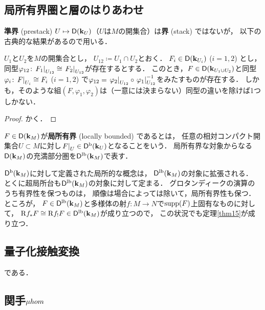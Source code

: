 \subsection{局所有界圏と層のはりあわせ}

\textbf{準界} (prestack) \(
    U\mapsto \Domp(\kk_U)
\)（\(U\)は\(M\)の開集合）は\textbf{界} (stack) ではないが，
以下の古典的な結果があるので用いる．
\begin{LMM}
    \(U_1\)と\(U_2\)を\(M\)の開集合とし，
    \(U_{12}\coloneqq U_1\cap U_2\)とおく．
    \(F_{i}\in\Domp(\kk_{U_i})\) (\(i=1,2\)) とし，
    同型\(
        \varphi_{12}\colon 
        \mres[F_{1}]{U_{12}}\cong \mres[F_{2}]{U_{12}}
    \)が存在するとする．
    このとき，\(F\in\Domp(\kk_{U_1\cup U_2})\)と同型\(
        \varphi_{i}\colon \mres[F]{U_{i}}\cong F_{i}
    \) (\(i=1,2\)) で\(
        \varphi_{12}=
        \mres[\varphi_{2}]{U_{12}}
        \circ
        \mres[\varphi_{1}]{U_{12}}^{-1}
    \)をみたすものが存在する．
    しかも，そのような組\(
        (F,\varphi_1,\varphi_2)
    \)は（一意には決まらない）同型の違いを除けば1つしかない．
\end{LMM}
\begin{proof}
    かく．
\end{proof}
\begin{DFN}
    \(F\in\Domp(\kk_M)\)が\textbf{局所有界} (locally bounded) であるとは，
    任意の相対コンパクト開集合\(U\subset M\)に対し\(\mres[F]{U}\in\Dompb(\kk_U)\)となることをいう．
    局所有界な対象からなる\(\Domp(\kk_M)\)の充満部分圏を\(\Domplb(\kk_M)\)で表す．
\end{DFN}

\(\Dompb(\kk_M)\)に対して定義された局所的な概念は，
\(\Domplb(\kk_M)\)の対象に拡張される．
とくに超局所台も\(\Domplb(\kk_M)\)の対象に対して定まる．
グロタンディークの演算のうち有界性を保つものは，
順像は場合によっては除いて，局所有界性も保つ．
ところが，
\(F\in\Domplb(\kk_M)\)と多様体の射\(
    f\colon M\to N
\)で\(\supp(F)\)上固有なものに対して，
\(
    \Rder{f_{\ast}}F\cong\Rder{f_{!}}F\in\Domplb(\kk_M)
\)が成り立つので，
この状況でも定理\ref{thm15}が成り立つ．



\subsection{量子化接触変換{\cite[7.2節]{KS90}}}
である．


\subsection{関手\(\muhom\) {\cite[4.4,7.2節]{KS90}}}

